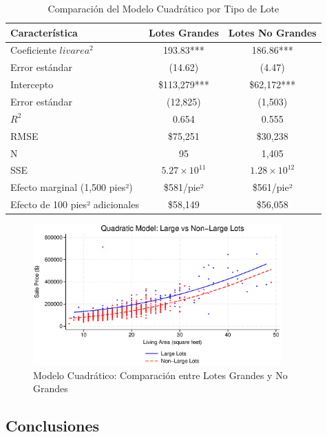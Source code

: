 \documentclass[12pt]{article}
\begin{document}
\begin{table}[h]
\centering
\begin{tabular}{lcc}
\hline
\textbf{Característica} & \textbf{Lotes Grandes} & \textbf{Lotes No Grandes} \\
\hline
Coeficiente $livarea^2$ & 193.83*** & 186.86*** \\
Error estándar & (14.62) & (4.47) \\
Intercepto & \$113,279*** & \$62,172*** \\
Error estándar & (12,825) & (1,503) \\
\hline
$R^2$ & 0.654 & 0.555 \\
RMSE & \$75,251 & \$30,238 \\
N & 95 & 1,405 \\
SSE & $5.27 \times 10^{11}$ & $1.28 \times 10^{12}$ \\
\hline
Efecto marginal (1,500 pies²) & \$581/pie² & \$561/pie² \\
Efecto de 100 pies² adicionales & \$58,149 & \$56,058 \\
\hline
\end{tabular}
\caption{Comparación del Modelo Cuadrático por Tipo de Lote}
\label{tab:lots_comparison}
\end{table}

\begin{figure}[htbp]
    \centering
    \includegraphics[width=0.85\textwidth]{Figures/0205-lots_comparison.eps}
    \caption{Modelo Cuadrático: Comparación entre Lotes Grandes y No Grandes}
    \label{fig:lots_comparison}
\end{figure}

\subsection*{Conclusiones}
\end{document}

